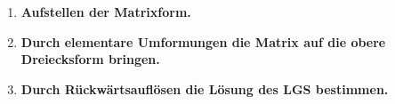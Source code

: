 \documentclass[a4paper,12pt, headsepline, ngerman]{scrartcl}
\theoremstyle{definition}
\begin{document}
\begin{enumerate}
    \item \textbf{Aufstellen der Matrixform.}
    \item \textbf{Durch elementare Umformungen die Matrix auf die obere Dreiecksform bringen.}
    \item \textbf{Durch Rückwärtsauflösen die Lösung des LGS bestimmen.}
\end{enumerate}
%
%
\end{document}
